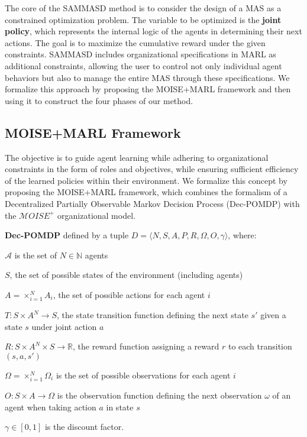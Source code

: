 \documentclass[sigconf,anonymous]{aamas}
\begin{document}
The core of the SAMMASD method is to consider the design of a MAS as a constrained optimization problem. The variable to be optimized is the \textbf{joint policy}, which represents the internal logic of the agents in determining their next actions. The goal is to maximize the cumulative reward under the given constraints. SAMMASD includes organizational specifications in MARL as additional constraints, allowing the user to control not only individual agent behaviors but also to manage the entire MAS through these specifications. We formalize this approach by proposing the MOISE+MARL framework and then using it to construct the four phases of our method.

\subsection{\textbf{MOISE+MARL Framework}}

The objective is to guide agent learning while adhering to organizational constraints in the form of roles and objectives, while ensuring sufficient efficiency of the learned policies within their environment. We formalize this concept by proposing the MOISE+MARL framework, which combines the formalism of a Decentralized Partially Observable Markov Decision Process (Dec-POMDP) with the $\mathcal{M}OISE^+$ organizational model.

\textbf{Dec-POMDP} \quad defined by a tuple $D = \langle N, S, A, P, R, \Omega, O, \gamma \rangle$, where:
%
\begin{itemize*}[label={},itemjoin={; }]
    \item $\mathcal{A}$ is the set of $N \in \mathbb{N}$ agents
    \item $S$, the set of possible states of the environment (including agents)
    \item $A = \times_{i=1}^N A_i $, the set of possible actions for each agent $i$
    \item $T: S \times A^N \to S$, the state transition function defining the next state $s'$ given a state $s$ under joint action $a$
    \item $R: S \times A^N \times  S \to \mathbb{R}$, the reward function assigning a reward $r$ to each transition $(s, a, s')$
    \item $\Omega = \times_{i=1}^N \Omega_i $ is the set of possible observations for each agent $i$
    \item $O: S \times A \to \Omega$ is the observation function defining the next observation $\omega$ of an agent when taking action $a$ in state $s$
    \item $\gamma \in [0, 1] $ is the discount factor.
\end{itemize*}
\end{document}

